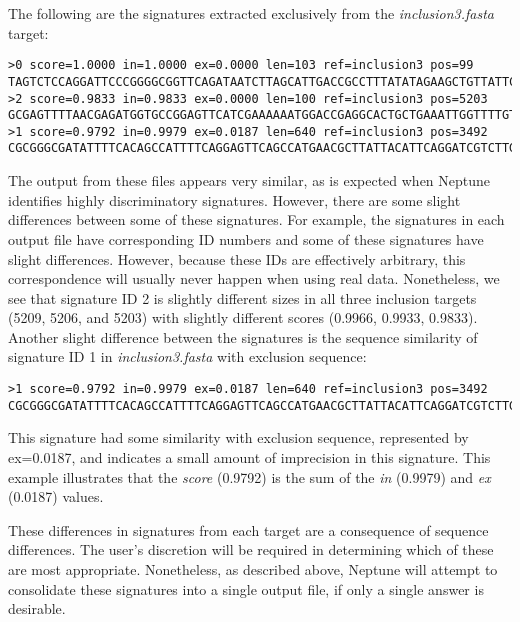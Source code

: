 \documentclass[a4paper,10pt]{article}
\begin{document}
The following are the signatures extracted exclusively from the \textit{inclusion3.fasta} target:

\begin{minipage}{\linewidth}
\begin{lstlisting}[frame=single, style=bash, title=output/sorted/inclusion3.fasta]
>0 score=1.0000 in=1.0000 ex=0.0000 len=103 ref=inclusion3 pos=99
TAGTCTCCAGGATTCCCGGGGCGGTTCAGATAATCTTAGCATTGACCGCCTTTATATAGAAGCTGTTATTCAAGAAGCAT...
>2 score=0.9833 in=0.9833 ex=0.0000 len=100 ref=inclusion3 pos=5203
GCGAGTTTTAACGAGATGGTGCCGGAGTTCATCGAAAAAATGGACCGAGGCACTGCTGAAATTGGTTTTGTATTTGGGGA...
>1 score=0.9792 in=0.9979 ex=0.0187 len=640 ref=inclusion3 pos=3492
CGCGGGCGATATTTTCACAGCCATTTTCAGGAGTTCAGCCATGAACGCTTATTACATTCAGGATCGTCTTGAGGCTCAGA...
\end{lstlisting}
\end{minipage}

The output from these files appears very similar, as is expected when Neptune identifies highly discriminatory signatures. However, there are some slight differences between some of these signatures. For example, the signatures in each output file have corresponding ID numbers and some of these signatures have slight differences. However, because these IDs are effectively arbitrary, this correspondence will usually never happen when using real data. Nonetheless, we see that signature ID 2 is slightly different sizes in all three inclusion targets (5209, 5206, and 5203) with slightly different scores (0.9966, 0.9933, 0.9833). Another slight difference between the signatures is the sequence similarity of signature ID 1 in \textit{inclusion3.fasta} with exclusion sequence:

\begin{minipage}{\linewidth}
\begin{lstlisting}[frame=single, style=bash]
>1 score=0.9792 in=0.9979 ex=0.0187 len=640 ref=inclusion3 pos=3492
CGCGGGCGATATTTTCACAGCCATTTTCAGGAGTTCAGCCATGAACGCTTATTACATTCAGGATCGTCTTGAGGCTCAGA...
\end{lstlisting}
\end{minipage}

This signature had some similarity with exclusion sequence, represented by ex=0.0187, and indicates a small amount of imprecision in this signature. This example illustrates that the \textit{score} (0.9792) is the sum of the \textit{in} (0.9979) and \textit{ex} (0.0187) values.

These differences in signatures from each target are a consequence of sequence differences. The user's discretion will be required in determining which of these are most appropriate. Nonetheless, as described above, Neptune will attempt to consolidate these signatures into a single output file, if only a single answer is desirable.
\end{document}

